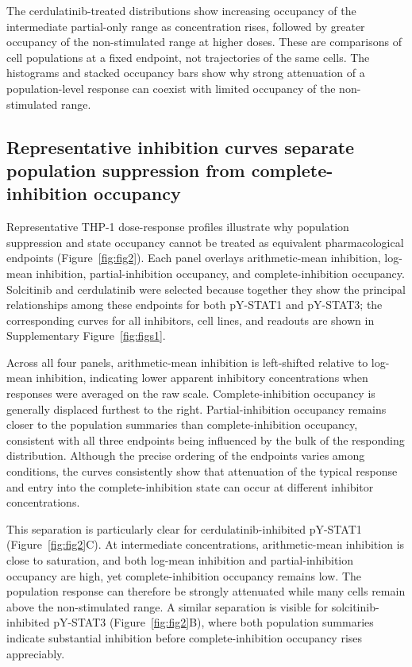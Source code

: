 \documentclass[11pt]{article}
\newcommand{\pstatone}{pY-STAT1}
\newcommand{\pstatthree}{pY-STAT3}
\begin{document}
The cerdulatinib-treated distributions show increasing occupancy of the intermediate partial-only range as concentration rises, followed by greater occupancy of the non-stimulated range at higher doses. These are comparisons of cell populations at a fixed endpoint, not trajectories of the same cells. The histograms and stacked occupancy bars show why strong attenuation of a population-level response can coexist with limited occupancy of the non-stimulated range.

\subsection*{Representative inhibition curves separate population suppression from complete-inhibition occupancy}

Representative THP-1 dose-response profiles illustrate why population suppression and state occupancy cannot be treated as equivalent pharmacological endpoints (Figure~\ref{fig:fig2}). Each panel overlays arithmetic-mean inhibition, log-mean inhibition, partial-inhibition occupancy, and complete-inhibition occupancy. Solcitinib and cerdulatinib were selected because together they show the principal relationships among these endpoints for both \pstatone{} and \pstatthree{}; the corresponding curves for all inhibitors, cell lines, and readouts are shown in Supplementary Figure~\ref{fig:figs1}.

Across all four panels, arithmetic-mean inhibition is left-shifted relative to log-mean inhibition, indicating lower apparent inhibitory concentrations when responses were averaged on the raw scale. Complete-inhibition occupancy is generally displaced furthest to the right. Partial-inhibition occupancy remains closer to the population summaries than complete-inhibition occupancy, consistent with all three endpoints being influenced by the bulk of the responding distribution. Although the precise ordering of the endpoints varies among conditions, the curves consistently show that attenuation of the typical response and entry into the complete-inhibition state can occur at different inhibitor concentrations.

This separation is particularly clear for cerdulatinib-inhibited \pstatone{} (Figure~\ref{fig:fig2}C). At intermediate concentrations, arithmetic-mean inhibition is close to saturation, and both log-mean inhibition and partial-inhibition occupancy are high, yet complete-inhibition occupancy remains low. The population response can therefore be strongly attenuated while many cells remain above the non-stimulated range. A similar separation is visible for solcitinib-inhibited \pstatthree{} (Figure~\ref{fig:fig2}B), where both population summaries indicate substantial inhibition before complete-inhibition occupancy rises appreciably.
\end{document}
